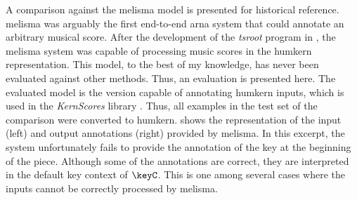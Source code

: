 
A comparison against the \gls{melisma} model is presented
for historical reference. \gls{melisma} was arguably the
first end-to-end \gls{arna} system that could annotate an
arbitrary musical score. After the development of the
\emph{tsroot} program in \textcite{sapp2009tsroot}, the
\gls{melisma} system was capable of processing music scores
in the \gls{humkern} representation. This model, to the best
of my knowledge, has never been evaluated against other
methods. Thus, an evaluation is presented here. The
evaluated model is the version capable of annotating
\gls{humkern} inputs, which is used in the \emph{KernScores}
library \parencite{sapp2005online}. Thus, all examples in
the test set of the comparison were converted to
\gls{humkern}.  shows the
representation of the input (left) and output annotations
(right) provided by \gls{melisma}. In this excerpt, the
system unfortunately fails to provide the annotation of the
key at the beginning of the piece. Although some of the
annotations are correct, they are interpreted in the default
key context of $\keyC$. This is one among several cases
where the inputs cannot be correctly processed by
\gls{melisma}.



